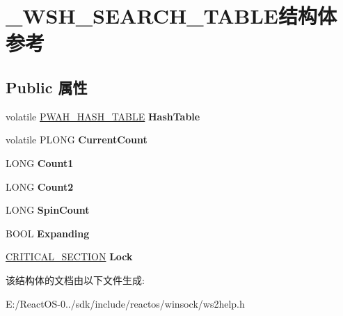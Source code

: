 \hypertarget{struct___w_s_h___s_e_a_r_c_h___t_a_b_l_e}{}\section{\+\_\+\+W\+S\+H\+\_\+\+S\+E\+A\+R\+C\+H\+\_\+\+T\+A\+B\+L\+E结构体 参考}
\label{struct___w_s_h___s_e_a_r_c_h___t_a_b_l_e}
\subsection*{Public 属性}
\begin{DoxyCompactItemize}
\item 
\mbox{\label{struct___w_s_h___s_e_a_r_c_h___t_a_b_l_e_a28f25c6c04cc2de8b6b556033e272db7}} 
volatile \hyperlink{struct___w_s_h___h_a_s_h___t_a_b_l_e}{P\+W\+A\+H\+\_\+\+H\+A\+S\+H\+\_\+\+T\+A\+B\+LE} {\bfseries Hash\+Table}
\item 
\mbox{\label{struct___w_s_h___s_e_a_r_c_h___t_a_b_l_e_ac2db8a67fda2d409c9c8c72a54c053b7}} 
volatile P\+L\+O\+NG {\bfseries Current\+Count}
\item 
\mbox{\label{struct___w_s_h___s_e_a_r_c_h___t_a_b_l_e_a4dc2ed65e4aeb0fa8a45cd9469c698b1}} 
L\+O\+NG {\bfseries Count1}
\item 
\mbox{\label{struct___w_s_h___s_e_a_r_c_h___t_a_b_l_e_ad5255491526d11b0aa399c9f662de873}} 
L\+O\+NG {\bfseries Count2}
\item 
\mbox{\label{struct___w_s_h___s_e_a_r_c_h___t_a_b_l_e_afd05f44b410cec6c8e5de93b0d104d46}} 
L\+O\+NG {\bfseries Spin\+Count}
\item 
\mbox{\label{struct___w_s_h___s_e_a_r_c_h___t_a_b_l_e_af1d427cb998b682edbe41312e60c6507}} 
B\+O\+OL {\bfseries Expanding}
\item 
\mbox{\label{struct___w_s_h___s_e_a_r_c_h___t_a_b_l_e_a2075f928a3ad27261b985f9d9dfe6137}} 
\hyperlink{struct___c_r_i_t_i_c_a_l___s_e_c_t_i_o_n}{C\+R\+I\+T\+I\+C\+A\+L\+\_\+\+S\+E\+C\+T\+I\+ON} {\bfseries Lock}
\end{DoxyCompactItemize}


该结构体的文档由以下文件生成\+:\begin{DoxyCompactItemize}
\item 
E\+:/\+React\+O\+S-\/0../sdk/include/reactos/winsock/ws2help.\+h\end{DoxyCompactItemize}
